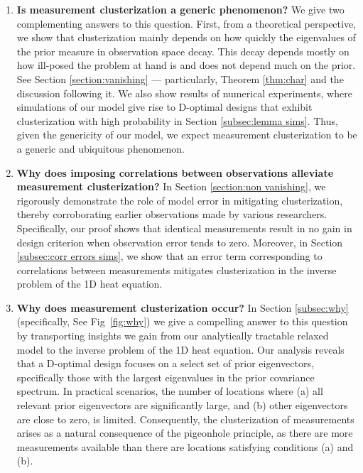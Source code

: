 \begin{enumerate}
\item \label{q:generic} \textbf{Is measurement clusterization a
  generic phenomenon?}
  We give two complementing answers to this question. First, from a
  theoretical perspective, we show that clusterization mainly depends
  on how quickly the eigenvalues of the prior measure in observation
  space decay. This decay depends mostly on how ill-posed the problem
  at hand is and does not depend much on the prior. See Section
  \ref{section:vanishing} --- particularly, Theorem \ref{thm:char} and
  the discussion following it. We also show results of numerical
  experiments, where simulations of our model give rise to D-optimal
  designs that exhibit clusterization with high probability in Section
  \ref{subsec:lemma sims}. Thus, given the genericity of our model, we
  expect measurement clusterization to be a generic and ubiquitous
  phenomenon.

\item \label{q:mitigate} \textbf{Why does imposing correlations
  between observations alleviate measurement clusterization?} In
  Section \ref{section:non vanishing}, we rigorously demonstrate the
  role of model error in mitigating clusterization, thereby
  corroborating earlier observations made by various
  researchers. Specifically, our proof shows that identical
  measurements result in no gain in design criterion when observation
  error tends to zero. Moreover, in Section \ref{subsec:corr errors
    sims}, we show that an error term corresponding to correlations
  between measurements mitigates clusterization in the inverse problem
  of the 1D heat equation.

\item \label{q:why} \textbf{Why does measurement clusterization
  occur?} In Section \ref{subsec:why} (specifically, See
  Fig~\ref{fig:why}) we give a compelling answer to this question by
  transporting insights we gain from our analytically tractable
  relaxed model to the inverse problem of the 1D heat equation. Our
  analysis reveals that a D-optimal design focuses on a select set of
  prior eigenvectors, specifically those with the largest eigenvalues
  in the prior covariance spectrum. In practical scenarios, the number
  of locations where (a) all relevant prior eigenvectors are
  significantly large, and (b) other eigenvectors are close to zero,
  is limited. Consequently, the clusterization of measurements arises
  as a natural consequence of the pigeonhole principle, as there are
  more measurements available than there are locations satisfying
  conditions (a) and (b).



\end{enumerate}
